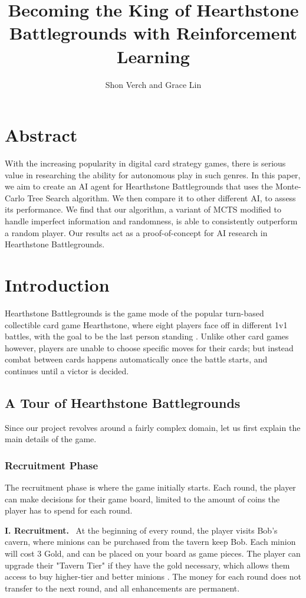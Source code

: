 \documentclass{paper}
\title{\bf{Becoming the King of Hearthstone \\ Battlegrounds with Reinforcement Learning}}
\author{Shon Verch and Grace Lin}
\date{}
\newcommand{\inlineSection}[1]{\vspace{0.5em}\noindent\textbf{#1.}~}
\begin{document}
\maketitle

\section*{Abstract}
With the increasing popularity in digital card strategy games, there is serious value in researching the ability for autonomous play in such genres. In this paper, we aim to create an AI agent for Hearthstone Battlegrounds that uses the Monte-Carlo Tree Search algorithm. We then compare it to other different AI, to assess its performance. We find that our algorithm, a variant of MCTS modified to handle imperfect information and randomness, is able to consistently outperform a random player. Our results act as a proof-of-concept for AI research in Hearthstone Battlegrounds.

\section{Introduction}
Hearthstone Battlegrounds is the game mode of the popular turn-based collectible card game Hearthstone, where eight players face off in different 1v1 battles, with the goal to be the last person standing \cite{blizzardentertainment2019}. Unlike other card games however, players are unable to choose specific moves for their cards; but instead combat between cards happens automatically once the battle starts, and continues until a victor is decided. 

\subsection{A Tour of Hearthstone Battlegrounds}
Since our project revolves around a fairly complex domain, let us first explain the main details of the game. 
\subsubsection{Recruitment Phase}
The recruitment phase is where the game initially starts. Each round, the player can make decisions for their game board, limited to the amount of coins the player has to spend for each round. 

\inlineSection{I. Recruitment}
At the beginning of every round, the player visits Bob's cavern, where minions can be purchased from the tavern keep Bob. Each minion will cost 3 Gold, and can be placed on your board as game pieces. The player can upgrade their "Tavern Tier" if they have the gold necessary, which allows them access to buy higher-tier and better minions \cite{battlegrounds2019}. The money for each round does not transfer to the next round, and all enhancements are permanent. 
\end{document}

